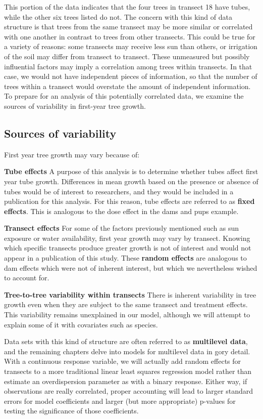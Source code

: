 \documentclass[
]{krantz}
\begin{document}
This portion of the data indicates that the four trees in transect 18 have tubes, while the other six trees listed do not. The concern with this kind of data structure is that trees from the same transect may be more similar or correlated with one another in contrast to trees from other transects. This could be true for a variety of reasons: some transects may receive less sun than others, or irrigation of the soil may differ from transect to transect. These unmeasured but possibly influential factors may imply a correlation among trees within transects. In that case, we would not have independent pieces of information, so that the number of trees within a transect would overstate the amount of independent information. To prepare for an analysis of this potentially correlated data, we examine the sources of variability in first-year tree growth.

\hypertarget{sources-of-variability-1}{%
\subsection{Sources of variability}\label{sources-of-variability-1}}

First year tree growth may vary because of:

\textbf{Tube effects} A purpose of this analysis is to determine whether tubes affect first year tube growth. Differences in mean growth based on the presence or absence of tubes would be of interest to researchers, and they would be included in a publication for this analysis. For this reason, tube effects are referred to as \textbf{fixed effects}. This is analogous to the dose effect in the dams and pups example.

\textbf{Transect effects} For some of the factors previously mentioned such as sun exposure or water availability, first year growth may vary by transect. Knowing which specific transects produce greater growth is not of interest and would not appear in a publication of this study. These \textbf{random effects} are analogous to dam effects which were not of inherent interest, but which we nevertheless wished to account for.

\textbf{Tree-to-tree variability within transects} There is inherent variability in tree growth even when they are subject to the same transect and treatment effects. This variability remains unexplained in our model, although we will attempt to explain some of it with covariates such as species.

Data sets with this kind of structure are often referred to as \textbf{multilevel data}, and the remaining chapters delve into models for multilevel data in gory detail. With a continuous response variable, we will actually add random effects for transects to a more traditional linear least squares regression model rather than estimate an overdispersion parameter as with a binary response. Either way, if observations are really correlated, proper accounting will lead to larger standard errors for model coefficients and larger (but more appropriate) p-values for testing the significance of those coefficients.
\end{document}
